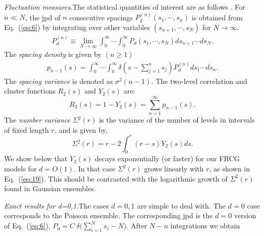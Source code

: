 \documentclass[reprint,amsmath,amssymb,showpacs,aps,]{revtex4-1}
\begin{document}
{\textit{Fluctuation measures.}\textemdash The statistical quantities of interest are as follows \cite{Brody,BG,ML}. For $n\ll N$, the jpd of $n$ consecutive spacings $P^{(n)}_{d}(s_{1},\cdots,s_{n})$ is obtained from Eq.~(\ref{eq:6}) by integrating over other variables $(s_{n+1},\cdots,s_{N})$ for $N \rightarrow \infty$. 
\begin{equation}\label{eq:7}
\begin{split}
P^{(n)}_{d}
\equiv\lim_{N\to\infty}  \int_{0}^{\infty}\cdots \int_{0}^{\infty}P_{d}(s_{1},\cdots,s_{N})ds_{n+1}\cdots ds_{N}.
\end{split}
\end{equation}
The \textit{spacing density} is given by $(n\geq 1)$
\begin{equation}\label{eq:8}
\begin{split}
p_{n-1}(s)=\int_{0}^{\infty}\cdots\int_{0}^{\infty} \delta (s-\sum_{j=1}^{n}s_{j})
P_{d}^{(n)}ds_{1}\cdots ds_{n}.
\end{split}
\end{equation}
The \textit{spacing variance} is denoted as $\sigma^{2}(n-1)$. The two-level correlation and cluster functions $R_{2}(s)$ and $Y_{2}(s)$ are:
\begin{equation}\label{eq:9}
R_{2}(s)= 1- Y_{2}(s)= \sum_{n=1}^{\infty}p_{n-1}(s).
\end{equation}
The \textit{number variance} $\Sigma{}^{2}(r)$ is the variance of the number of levels in intervals of fixed length $r$, and is given by,
\begin{equation}\label{eq:10}
\Sigma{}^{2}(r)= r-2\int_{0}^{r}(r-s)Y_{2}(s)ds.
\end{equation}
We show below that $Y_{2}(s)$ decays exponentially (or faster) for our FRCG models for $d=O(1)$. In that case $\Sigma^{2}(r)$ grows linearly with $r$, as shown in Eq.~(\ref{eq:19}). This should be contrasted with the logarithmic growth of $\Sigma^{2}(r)$ found in Gaussian ensembles.\par
\textit{Exact results for d=0,1.}\textemdash The cases $d=0,1$ are simple to deal with. The $d=0$ case corresponds to the Poisson ensemble. The corresponding jpd is the $d=0$ version of Eq.~(\ref{eq:6}), $P_{0}= C~\delta\Big( \sum_{i=1}^{N}s_{i}-N \Big)$. After $N-n$ integrations we obtain
}
\end{document}

